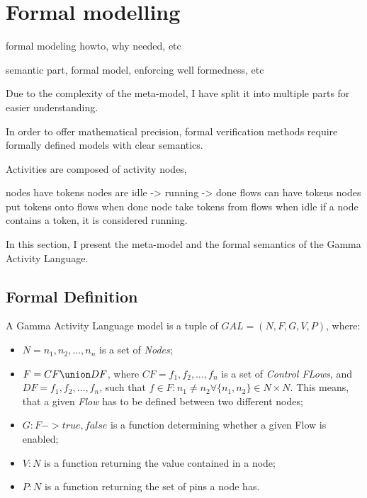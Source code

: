 \clearpage\section{Formal modelling}


formal modeling howto, why needed, etc

semantic part, formal model, enforcing well formedness, etc

Due to the complexity of the meta-model, I have split it into multiple parts for easier understanding.


In order to offer mathematical precision, formal verification methods require formally defined models with clear semantics. 

Activities are composed of activity nodes, 

nodes have tokens
nodes are idle -> running -> done
flows can have tokens
nodes put tokens onto flows when done
node take tokens from flows when idle
if a node contains a token, it is considered running.

In this section, I present the meta-model and the formal semantics of the Gamma Activity Language.

\subsection{Formal Definition}

\begin{definition}
	A Gamma Activity Language model is a tuple of \(GAL = (N, F, G, V, P)\), where:
	
	\begin{itemize}
		\item \(N = { n_1, n_2, \dots, n_n } \) is a set of \emph{Nodes};
		\item \(F = CF \union DF \), where \( CF = { f_1, f_2, \dots, f_n } \) is a set of \emph{Control FLows}, and \( DF = { f_1, f_2, \dots, f_n } \), such that \(f \in F : n_1 \neq n_2 \forall \{n_1, n_2\} \in N \times N\). This means, that a given \emph{Flow} has to be defined between two different nodes;
		\item \(G : F -> {true, false} \) is a function determining whether a given Flow is enabled;
		\item \(V : N \) is a function returning the value contained in a node;
		\item \(P : N \) is a function returning the set of pins a node has.
	\end{itemize}
	
\end{definition}


